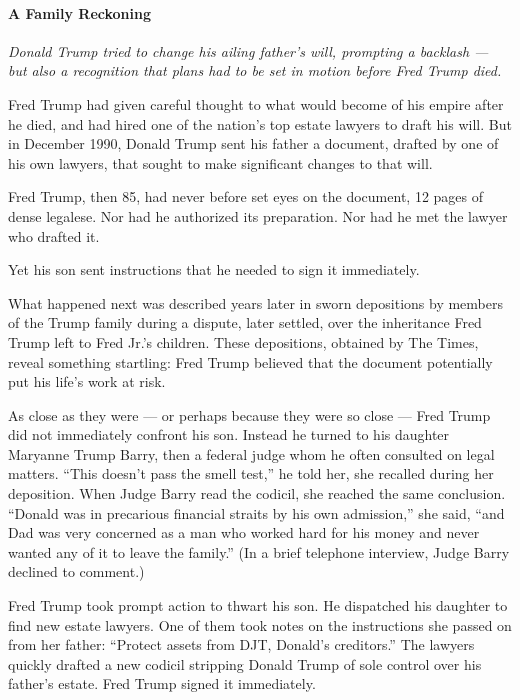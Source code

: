 \hypertarget{a-family-reckoning}{%
\paragraph{A Family Reckoning}\label{a-family-reckoning}}

\emph{Donald Trump tried to change his ailing father's will, prompting a
backlash --- but also a recognition that plans had to be set in motion
before Fred Trump died.}

Fred Trump had given careful thought to what would become of his empire
after he died, and had hired one of the nation's top estate lawyers to
draft his will. But in December 1990, Donald Trump sent his father a
document, drafted by one of his own lawyers, that sought to make
significant changes to that will.

Fred Trump, then 85, had never before set eyes on the document, 12 pages
of dense legalese. Nor had he authorized its preparation. Nor had he met
the lawyer who drafted it.

Yet his son sent instructions that he needed to sign it immediately.

What happened next was described years later in sworn depositions by
members of the Trump family during a dispute, later settled, over the
inheritance Fred Trump left to Fred Jr.'s children. These depositions,
obtained by The Times, reveal something startling: Fred Trump believed
that the document potentially put his life's work at risk.

As close as they were --- or perhaps because they were so close --- Fred
Trump did not immediately confront his son. Instead he turned to his
daughter Maryanne Trump Barry, then a federal judge whom he often
consulted on legal matters. ``This doesn't pass the smell test,'' he
told her, she recalled during her deposition. When Judge Barry read the
codicil, she reached the same conclusion. ``Donald was in precarious
financial straits by his own admission,'' she said, ``and Dad was very
concerned as a man who worked hard for his money and never wanted any of
it to leave the family.'' (In a brief telephone interview, Judge Barry
declined to comment.)

Fred Trump took prompt action to thwart his son. He dispatched his
daughter to find new estate lawyers. One of them took notes on the
instructions she passed on from her father: ``Protect assets from DJT,
Donald's creditors.'' The lawyers quickly drafted a new codicil
stripping Donald Trump of sole control over his father's estate. Fred
Trump signed it immediately.

